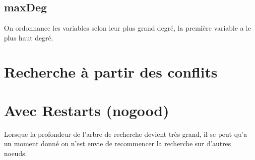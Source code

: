 \subsection{ maxDeg}
On ordonnance les variables selon leur plus grand degré, la première variable a le plus haut degré.

\section{Recherche à partir des conflits}


\pagebreak
\section{Avec Restarts (nogood)}
Lorsque la profondeur de l'arbre de recherche devient très grand, il se peut qu'a un moment donné on n'est envie de recommencer la recherche sur d'autres noeuds.\\


\pagebreak